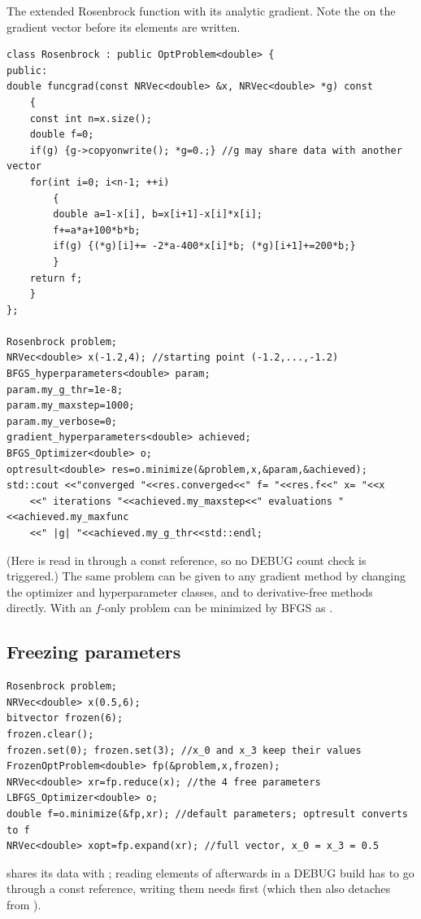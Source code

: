 The extended Rosenbrock function with its analytic gradient. Note the  on the gradient vector before its
elements are written.
\begin{lstlisting}
class Rosenbrock : public OptProblem<double> {
public:
double funcgrad(const NRVec<double> &x, NRVec<double> *g) const
	{
	const int n=x.size();
	double f=0;
	if(g) {g->copyonwrite(); *g=0.;} //g may share data with another vector
	for(int i=0; i<n-1; ++i)
		{
		double a=1-x[i], b=x[i+1]-x[i]*x[i];
		f+=a*a+100*b*b;
		if(g) {(*g)[i]+= -2*a-400*x[i]*b; (*g)[i+1]+=200*b;}
		}
	return f;
	}
};

Rosenbrock problem;
NRVec<double> x(-1.2,4); //starting point (-1.2,...,-1.2)
BFGS_hyperparameters<double> param;
param.my_g_thr=1e-8;
param.my_maxstep=1000;
param.my_verbose=0;
gradient_hyperparameters<double> achieved;
BFGS_Optimizer<double> o;
optresult<double> res=o.minimize(&problem,x,&param,&achieved);
std::cout <<"converged "<<res.converged<<" f= "<<res.f<<" x= "<<x
	<<" iterations "<<achieved.my_maxstep<<" evaluations "<<achieved.my_maxfunc
	<<" |g| "<<achieved.my_g_thr<<std::endl;
\end{lstlisting}
(Here  is read in  through a const reference, so no DEBUG count check is triggered.) The same problem
can be given to any gradient method by changing the optimizer and hyperparameter classes, and to derivative-free methods
directly. With  an $f$-only problem can be minimized by BFGS as
.

\subsection{Freezing parameters}\label{sec:optimize:ex:frozen}

\begin{lstlisting}
Rosenbrock problem;
NRVec<double> x(0.5,6);
bitvector frozen(6);
frozen.clear();
frozen.set(0); frozen.set(3); //x_0 and x_3 keep their values
FrozenOptProblem<double> fp(&problem,x,frozen);
NRVec<double> xr=fp.reduce(x); //the 4 free parameters
LBFGS_Optimizer<double> o;
double f=o.minimize(&fp,xr); //default parameters; optresult converts to f
NRVec<double> xopt=fp.expand(xr); //full vector, x_0 = x_3 = 0.5
\end{lstlisting}
 shares its data with ; reading elements of  afterwards in a DEBUG build has to go through a const
reference, writing them needs  first (which then also detaches  from ).

